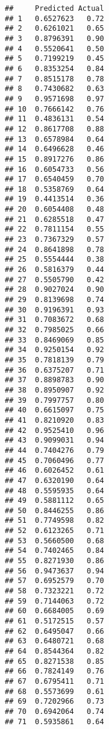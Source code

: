\documentclass[
]{article}
\newenvironment{Shaded}{\begin{snugshade}}{\end{snugshade}}
\newcommand{\FunctionTok}[1]{\textcolor[rgb]{0.00,0.00,0.00}{#1}}
\newcommand{\NormalTok}[1]{#1}
\newcommand{\OtherTok}[1]{\textcolor[rgb]{0.56,0.35,0.01}{#1}}
\newcommand{\SpecialCharTok}[1]{\textcolor[rgb]{0.00,0.00,0.00}{#1}}
\newcommand{\StringTok}[1]{\textcolor[rgb]{0.31,0.60,0.02}{#1}}
\begin{document}
\begin{Shaded}
\end{Shaded}

\begin{verbatim}
##     Predicted Actual
## 1   0.6527623   0.72
## 2   0.6261021   0.65
## 3   0.8796391   0.90
## 4   0.5520641   0.50
## 5   0.7199219   0.45
## 6   0.8353254   0.84
## 7   0.8515178   0.78
## 8   0.7430682   0.63
## 9   0.9571698   0.97
## 10  0.7666142   0.76
## 11  0.4836131   0.54
## 12  0.8617708   0.88
## 13  0.6578984   0.64
## 14  0.6496628   0.46
## 15  0.8917276   0.86
## 16  0.6054733   0.56
## 17  0.6540459   0.70
## 18  0.5358769   0.64
## 19  0.4413514   0.36
## 20  0.6054408   0.48
## 21  0.6285518   0.47
## 22  0.7811154   0.55
## 23  0.7367329   0.57
## 24  0.8641898   0.78
## 25  0.5554444   0.38
## 26  0.5816379   0.44
## 27  0.5505790   0.42
## 28  0.9027024   0.90
## 29  0.8139698   0.74
## 30  0.9196391   0.93
## 31  0.7083672   0.68
## 32  0.7985025   0.66
## 33  0.8469069   0.85
## 34  0.9250154   0.92
## 35  0.7818139   0.79
## 36  0.6375207   0.71
## 37  0.8898783   0.90
## 38  0.8950907   0.92
## 39  0.7997757   0.80
## 40  0.6615097   0.75
## 41  0.8210920   0.83
## 42  0.9525410   0.96
## 43  0.9099031   0.94
## 44  0.7404276   0.79
## 45  0.7060496   0.77
## 46  0.6026452   0.61
## 47  0.6320190   0.64
## 48  0.5595935   0.64
## 49  0.5881112   0.65
## 50  0.8446255   0.86
## 51  0.7749598   0.82
## 52  0.6123265   0.71
## 53  0.5660500   0.68
## 54  0.7402465   0.84
## 55  0.8271930   0.86
## 56  0.9473637   0.94
## 57  0.6952579   0.70
## 58  0.7323221   0.72
## 59  0.7144063   0.72
## 60  0.6684005   0.69
## 61  0.5172515   0.57
## 62  0.6495047   0.66
## 63  0.6480721   0.68
## 64  0.8544364   0.82
## 65  0.8271538   0.85
## 66  0.7824149   0.76
## 67  0.6795411   0.71
## 68  0.5573699   0.61
## 69  0.7202966   0.73
## 70  0.6942064   0.74
## 71  0.5935861   0.64

\end{verbatim}
\end{document}
